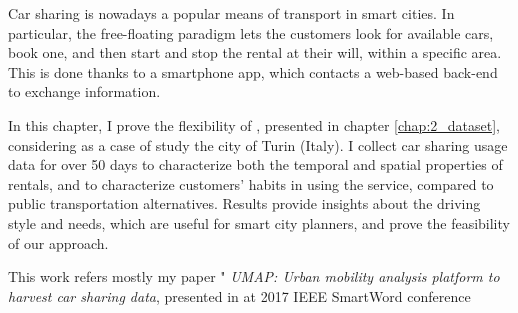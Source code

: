 Car sharing is nowadays a popular means of transport in smart cities. In particular, the free-floating paradigm lets the customers look for available cars, book one, and then start and stop the rental at their will, within a specific area. This is done thanks to a smartphone app, which contacts a web-based back-end to exchange information. 

In this chapter, I prove the flexibility of \tool, presented in chapter \ref{chap:2_dataset}, considering as  a case of study the city of Turin (Italy). I collect car sharing usage data for over 50 days to characterize both the temporal and spatial properties of rentals, and to characterize customers' habits in using the service, compared to public transportation  alternatives. Results provide insights about the driving style and needs, which are useful for smart city planners, and prove the feasibility of our approach.

This work refers mostly my paper " \textit{UMAP: Urban mobility analysis platform to harvest car sharing data}, presented in at 2017 IEEE SmartWord conference \cite{ciociolaumap}

